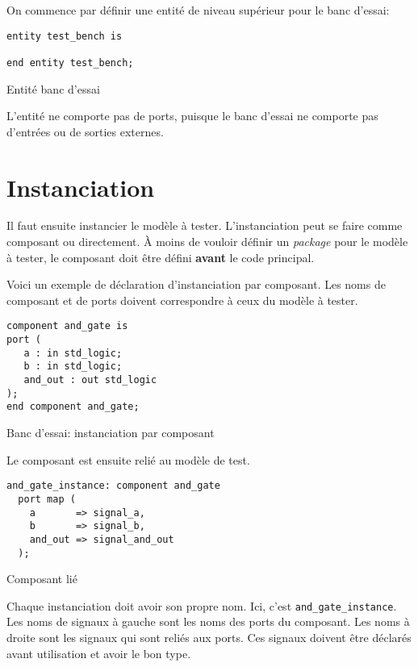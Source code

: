 \documentclass[letter, oneside]{book}
\begin{document}
On commence par définir une entité de niveau supérieur pour le banc
d'essai:

\begin{listing}[htbp]
\begin{verbatim}
entity test_bench is

end entity test_bench;
\end{verbatim}
\caption{Entité banc d'essai}
\end{listing}

L'entité ne comporte pas de ports, puisque le banc d'essai ne comporte
pas d'entrées ou de sorties externes.

\section{Instanciation}
\label{sec:org9f5e8da}

Il faut ensuite instancier le modèle à tester. L'instanciation peut se
faire comme composant ou directement. À moins de vouloir définir un
\emph{package} pour le modèle à tester, le composant doit être défini \textbf{avant}
le code principal. 

Voici un exemple de déclaration d'instanciation par composant. Les
noms de composant et de ports doivent correspondre à ceux du modèle à
tester.

\begin{listing}[htbp]
\begin{verbatim}
component and_gate is 
port ( 
   a : in std_logic; 
   b : in std_logic; 
   and_out : out std_logic 
); 
end component and_gate; 
\end{verbatim}
\caption{Banc d'essai: instanciation par composant}
\end{listing}

Le composant est ensuite relié au modèle de test. 

\begin{listing}[htbp]
\begin{verbatim}
and_gate_instance: component and_gate
  port map (
    a       => signal_a,
    b       => signal_b,
    and_out => signal_and_out
  );
\end{verbatim}
\caption{Composant lié}
\end{listing}

Chaque instanciation doit avoir son propre nom. Ici, c'est
\texttt{and\_gate\_instance}. Les noms de signaux à gauche sont les noms des
ports du composant. Les noms à droite sont les signaux qui sont reliés
aux ports. Ces signaux doivent être déclarés avant utilisation et
avoir le bon type.
\end{document}
